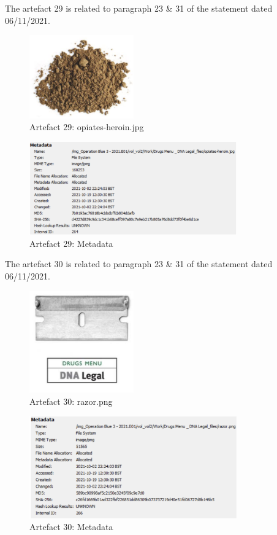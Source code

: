 The artefact 29 is related to paragraph 23 \& 31 of the statement
dated 06/11/2021.
\begin{figure}[H]
  \centering
  \includegraphics[width=0.4\textwidth]{figures/artefact29}
  \caption{Artefact 29: opiates-heroin.jpg}
  \label{f:artefact29}
\end{figure}
\begin{figure}[H]
  \centering
  \includegraphics[width=0.8\textwidth]{figures/meta29}
  \caption{Artefact 29: Metadata}
  \label{f:meta29}
\end{figure}
The artefact 30 is related to paragraph 23 \& 31 of the statement
dated 06/11/2021.
\begin{figure}[H]
  \centering
  \includegraphics[width=0.4\textwidth]{figures/artefact30}
  \caption{Artefact 30: razor.png}
  \label{f:artefact30}
\end{figure}
\begin{figure}[H]
  \centering
  \includegraphics[width=0.8\textwidth]{figures/meta30}
  \caption{Artefact 30: Metadata}
  \label{f:meta30}
\end{figure}
